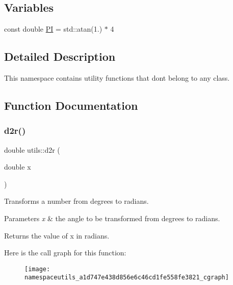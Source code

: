 \subsection*{Variables}
\begin{DoxyCompactItemize}
\item 
const double \hyperlink{namespaceutils_a92ce7d254229929886551de7417e1912}{PI} = std\+::atan(1.) $\ast$ 4
\end{DoxyCompactItemize}


\subsection{Detailed Description}
This namespace contains utility functions that don\textquotesingle{}t belong to any class. 

\subsection{Function Documentation}
\mbox{\label{namespaceutils_a1d747e438d856e6c46cd1fe558fe3821}} 
\subsubsection{\texorpdfstring{d2r()}{d2r()}}
{\footnotesize\ttfamily double utils\+::d2r (\begin{DoxyParamCaption}\item[{double}]{x }\end{DoxyParamCaption})\hspace{0.3cm}{\ttfamily [inline]}}

Transforms a number from degrees to radians. 
\begin{DoxyParams}{Parameters}
{\em x} & the angle to be transformed from degrees to radians. \\
\hline
\end{DoxyParams}
\begin{DoxyReturn}{Returns}
the value of x in radians. 
\end{DoxyReturn}
Here is the call graph for this function\+:\nopagebreak
\begin{figure}[H]
\begin{center}
\leavevmode
\texttt{[image: namespaceutils\_a1d747e438d856e6c46cd1fe558fe3821\_cgraph]}
\end{center}
\end{figure}
\mbox{\label{namespaceutils_acd746b43155fa3033001f28a91a71cec}} 
